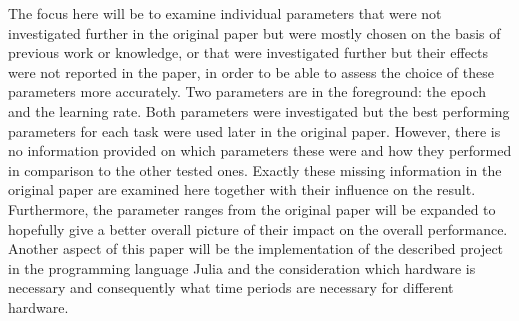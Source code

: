 The focus here will be to examine individual parameters that were not investigated further in the original paper but were mostly chosen on the basis of previous work or knowledge, or that were investigated further but their effects were not reported in the paper, in order to be able to assess the choice of these parameters more accurately. Two parameters are in the foreground: the epoch and the learning rate. Both parameters were investigated but the best performing parameters for each task were used later in the original paper. However, there is no information provided on which parameters these were and how they performed in comparison to the other tested ones. Exactly these missing information in the original paper are examined here together with their influence on the result. Furthermore, the parameter ranges from the original paper will be expanded to hopefully give a better overall picture of their impact on the overall performance.  Another aspect of this paper will be the implementation of the described project in the programming language Julia and the consideration which hardware is necessary and consequently what time periods are necessary for different hardware. 
